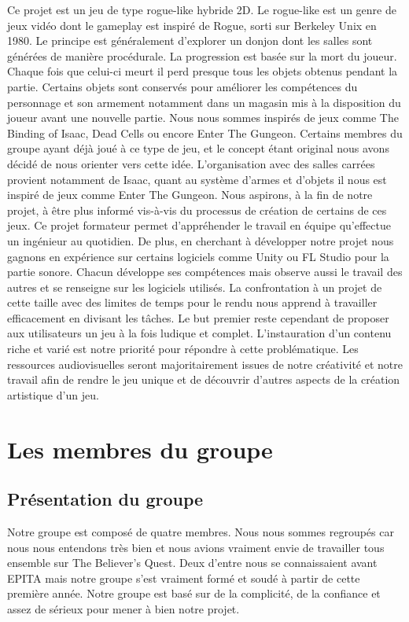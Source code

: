 \documentclass[]{extarticle}
\begin{document}
\bigbreak
\bigbreak
Ce projet est un jeu de type rogue-like hybride 2D. Le rogue-like est un genre de jeux vidéo dont le gameplay est inspiré de Rogue, sorti sur Berkeley Unix en 1980. Le principe est généralement d’explorer un donjon dont les salles sont générées de manière procédurale. La progression est basée sur la mort du joueur. Chaque fois que celui-ci meurt il perd presque tous les objets obtenus pendant la partie. Certains objets sont conservés pour améliorer les compétences du personnage et son armement notamment dans un magasin mis à la disposition du joueur avant une nouvelle partie.
\bigbreak
Nous nous sommes inspirés de jeux comme The Binding of Isaac, Dead Cells ou encore Enter The Gungeon. Certains membres du groupe ayant déjà joué à ce type de jeu, et le concept étant original nous avons décidé de nous orienter vers cette idée. L’organisation avec des salles carrées provient notamment de Isaac, quant au système d’armes et d’objets il nous est inspiré de jeux comme Enter The Gungeon.
\bigbreak
Nous aspirons, à la fin de notre projet, à être plus informé vis-à-vis du processus de création de certains de ces jeux. Ce projet formateur permet d’appréhender le travail en équipe qu’effectue un ingénieur au quotidien. De plus, en cherchant à développer notre projet nous gagnons en expérience sur certains logiciels comme Unity ou FL Studio pour la partie sonore. Chacun développe ses compétences mais observe aussi le travail des autres et se renseigne sur les logiciels utilisés. La confrontation à un projet de cette taille avec des limites de temps pour le rendu nous apprend à travailler efficacement en divisant les tâches.
\bigbreak
Le but premier reste cependant de proposer aux utilisateurs un jeu à la fois ludique et complet. L’instauration d’un contenu riche et varié est notre priorité pour répondre à cette problématique. Les ressources audiovisuelles seront majoritairement issues de notre créativité et notre travail afin de rendre le jeu unique et de découvrir d’autres aspects de la création artistique d’un jeu.

\newpage
\section{Les membres du groupe}
	\subsection{Présentation du groupe}
\bigbreak
\bigbreak
Notre groupe est composé de quatre membres. Nous nous sommes regroupés car nous nous entendons très bien et nous avions vraiment envie de travailler tous ensemble sur The Believer’s Quest. Deux d’entre nous se connaissaient avant EPITA mais notre groupe s’est vraiment formé et soudé à partir de cette première année. Notre groupe est basé sur de la complicité, de la confiance et assez de sérieux pour mener à bien notre projet.
\bigbreak
\end{document}
